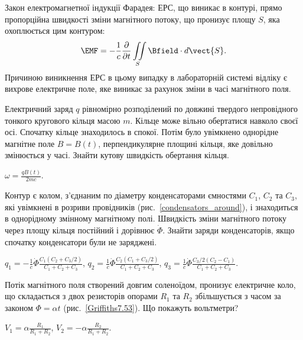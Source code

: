 \begin{Theory}
	Закон електромагнетної індукції Фарадея: ЕРС, що виникає в контурі, прямо пропорційна швидкості зміни магнітного потоку, що пронизує площу $S$, яка охоплюється цим контуром:
	\begin{equation}
		\EMF = - \frac1c\frac{\partial}{\partial t}\iint\limits_S \Bfield\cdot d\vect{S}.
	\end{equation}
	Причиною виникнення ЕРС в цьому випадку в лабораторній системі відліку є вихрове електричне поле, яке виникає за рахунок зміни в часі магнітного поля.
\end{Theory}
\begin{problem}%
Електричний заряд $q$ рівномірно розподілений по довжині твердого непровідного тонкого кругового кільця масою $m$. Кільце може вільно обертатися навколо своєї осі. Спочатку кільце знаходилось в спокої. Потім було увімкнено однорідне магнітне поле $B = B (t)$, перпендикулярне площині кільця, яке довільно змінюється у часі. Знайти кутову швидкість обертання кільця.
\begin{solution}
	$\omega = \frac{qB(t)}{2mc}$.
\end{solution}
\end{problem}

\begin{problem}\label{prb:condensators_around}
Контур є колом, з'єднаним по діаметру конденсаторами ємностями $C_1$, $C_2$ та $C_3$, які увімкнені в розриви провідників (рис.~\ref{condensators_around}), і знаходиться в однорідному змінному магнітному полі. Швидкість зміни магнітного потоку через площу кільця постійний і дорівнює $\dot{\Phi}$. Знайти заряди конденсаторів, якщо спочатку конденсатори були не заряджені.
\begin{solution}
	$q_1 = - \frac1c \dot{\Phi}\frac{C_1(C_2 + C_3/2)}{C_1 + C_2 +C_3}$, $q_2 =  \frac1c \dot{\Phi}\frac{C_2(C_1 + C_3/2)}{C_1 + C_2 +C_3}$, $q_3 =  \frac1c \dot{\Phi}\frac{C_3/2(C_2 - C_1)}{C_1 + C_2 +C_3}$.
\end{solution}
\end{problem}

\begin{problem}\label{prb:Griffiths7.53} %
Потік магнітного поля створений довгим соленоїдом, пронизує електричне коло, що складається з двох резисторів опорами $R_1$ та $R_2$ збільшується з часом за законом $\Phi = \alpha t$ (рис.~\ref{Griffiths7.53}). Що покажуть вольтметри?
\begin{solution}
	$V_1 = \alpha \frac{R_1}{R_1 + R_2}$, $V_2 = - \alpha \frac{R_2}{R_1 + R_2}$.
\end{solution}
\end{problem}


